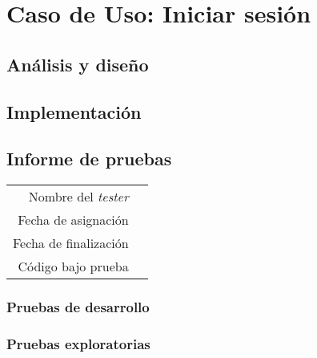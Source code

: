 \section{Caso de Uso: Iniciar sesión}

\subsection{Análisis y diseño}

\subsection{Implementación}

\subsection{Informe de pruebas}

{\small
\begin{tabular}{r|l}
Nombre del \textit{tester} & \\
Fecha de asignación & \\
Fecha de finalización & \\
Código bajo prueba &
\end{tabular}
}

\subsubsection{Pruebas de desarrollo}

\subsubsection{Pruebas exploratorias}

